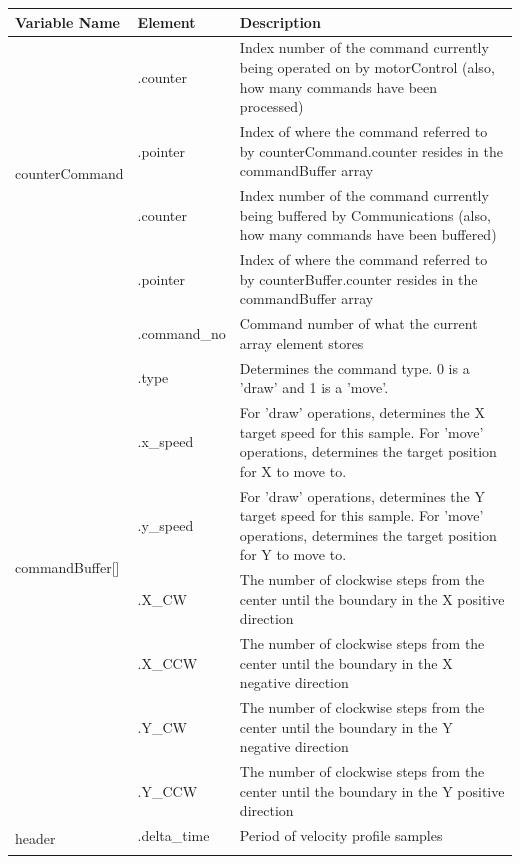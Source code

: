 	
		\begin{center}
			\begin{tabular}{|l|l|p{10cm}|}
				\hline
				Variable Name & Element & Description\\ \hline
				\multirow{4}{*}{counterCommand} & .counter & Index number of the command currently being operated on by motorControl (also, how many commands have been processed)\\ \cline{2-3}
					 & .pointer & Index of where the command referred to by counterCommand.counter resides in the commandBuffer array\\ \hline
				\multirow{4}{*}{counterBuffer} & .counter & Index number of the command currently being buffered by Communications (also, how many commands have been buffered)\\ \cline{2-3}
					 & .pointer & Index of where the command referred to by counterBuffer.counter resides in the commandBuffer array\\ \hline
				\multirow{8}{*}{commandBuffer[]} & .command\_no & Command number of what the current array element stores\\ \cline{2-3}
					& .type & Determines the command type. 0 is a 'draw' and 1 is a 'move'. \\ \cline{2-3}
					& .x\_speed & For 'draw' operations, determines the X target speed for this sample. For 'move' operations, determines the target position for X to move to. \\ \cline{2-3}
					& .y\_speed & For 'draw' operations, determines the Y target speed for this sample. For 'move' operations, determines the target position for Y to move to. \\ \hline
				\multirow{8}{*}{boundaries} & .X\_CW & The number of clockwise steps from the center until the boundary in the X positive direction\\ \cline{2-3}
					 & .X\_CCW & The number of clockwise steps from the center until the boundary in the X negative direction\\\cline{2-3}
					 & .Y\_CW & The number of clockwise steps from the center until the boundary in the Y negative direction\\ \cline{2-3}
					 & .Y\_CCW & The number of clockwise steps from the center until the boundary in the Y positive direction\\ \hline
				\multirow{6}{*}{header} & .delta\_time & Period of velocity profile samples\\ \cline{2-3}

\end{tabular}
\end{center}
